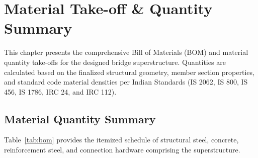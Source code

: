 \documentclass[12pt,a4paper]{report}
\numberwithin{table}{chapter}
\numberwithin{figure}{chapter}
\begin{document}
\noindent
\begin{minipage}[t]{0.31\textwidth}
\centering
{}
\label{fig:ed-bracing-sec}
\end{minipage}
\hfill
\begin{minipage}[t]{0.31\textwidth}
\centering
{}
\label{fig:ed-top-chord}
\end{minipage}
\hfill
\begin{minipage}[t]{0.31\textwidth}
\centering
{}
\label{fig:ed-bottom-chord}
\end{minipage}



\chapter{Material Take-off \& Quantity Summary}
\label{ch:material-takeoff}

This chapter presents the comprehensive Bill of Materials (BOM) and material quantity
take-offs for the designed bridge superstructure. Quantities are calculated based on
the finalized structural geometry, member section properties, and standard code material
densities per Indian Standards (IS 2062, IS 800, IS 456, IS 1786, IRC 24, and IRC 112).

\section{Material Quantity Summary}
\label{sec:material-summary}

Table~\ref{tab:bom} provides the itemized schedule of structural steel, concrete,
reinforcement steel, and connection hardware comprising the superstructure.
\end{document}
